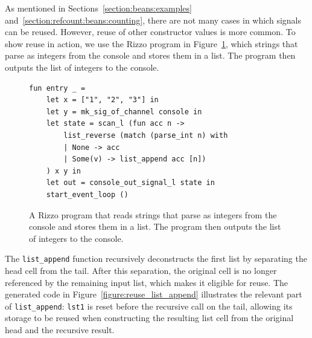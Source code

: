 

As mentioned in Sections~\ref{section:beans:examples} and~\ref{section:refcount:beans:counting}, there are not many cases in which signals can be reused. However, reuse of other constructor values is more common. To show reuse in action, we use the Rizzo program in Figure~\ref{figure:reuse_program_hell_yea}, which strings that parse as integers from the console and stores them in a list. The program then outputs the list of integers to the console.

\begin{figure}
    \begin{lstlisting}
fun entry _ =
    let x = ["1", "2", "3"] in
    let y = mk_sig_of_channel console in
    let state = scan_l (fun acc n ->
        list_reverse (match (parse_int n) with
        | None -> acc
        | Some(v) -> list_append acc [n])
    ) x y in
    let out = console_out_signal_l state in
    start_event_loop ()
    \end{lstlisting}
    \caption{A Rizzo program that reads strings that parse as integers from the console and stores them in a list. The program then outputs the list of integers to the console.}
    \label{figure:reuse_program_hell_yea}
\end{figure}

The \texttt{list\_append} function recursively deconstructs the first list by separating the head cell from the tail. After this separation, the original cell is no longer referenced by the remaining input list, which makes it eligible for reuse. The generated code in Figure~\ref{figure:reuse_list_append} illustrates the relevant part of \texttt{list\_append}: \texttt{lst1} is reset before the recursive call on the tail, allowing its storage to be reused when constructing the resulting list cell from the original head and the recursive result.

